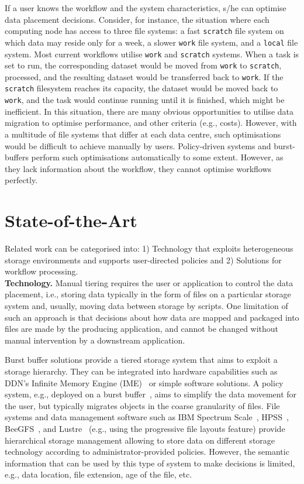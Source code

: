 \documentclass{superfri}
\begin{document}
If a user knows the workflow and the system characteristics, s/he can optimise data placement decisions.
Consider, for instance, the situation where each computing node has access to three file systems: a fast \texttt{scratch} file system on which data may reside only for a week, a slower \texttt{work} file system, and a \texttt{local} file system.
Most current workflows utilise \texttt{work} and \texttt{scratch} systems.
When a task is set to run, the corresponding dataset would be moved from \texttt{work} to \texttt{scratch}, processed, and the resulting dataset would be transferred back to \texttt{work}.
If the \texttt{scratch} filesystem reaches its capacity, the dataset would be moved back to \texttt{work}, and the task would continue running until it is finished, which might be inefficient.
In this situation, there are many obvious opportunities to utilise data migration to optimise performance, and other criteria (e.g., costs).
However, with a multitude of file systems that differ at each data centre, such optimisations would be difficult to achieve manually by users.
Policy-driven systems and burst-buffers perform such optimisations automatically to some extent. However, as they lack information about the workflow, they cannot optimise workflows perfectly.

\section{State-of-the-Art}
\label{sec:art}

Related work can be categorised into:
1) Technology that exploits heterogeneous storage environments and supports user-directed policies and
2) Solutions for workflow processing.\\

\textbf{Technology.}
Manual tiering requires the user or application to control the data placement, i.e., storing data typically in the form of files on a particular storage system and, usually, moving data between storage by scripts.
One limitation of such an approach is that decisions about how data are mapped and packaged into files are made by the producing application, and cannot be changed without manual intervention by a downstream application.

Burst buffer solutions provide a tiered storage system that aims to exploit a storage hierarchy.
They can be integrated into hardware capabilities such as DDN's Infinite Memory Engine (IME)~\cite{BODIAIFSFI19} or simple software solutions.
A policy system, e.g., deployed on a burst buffer~\cite{RomanusRP15}, aims to simplify the data movement for the user, but typically migrates objects in the coarse granularity of files.
File systems and data management software such as IBM Spectrum Scale~\cite{SchmuckH02}, HPSS~\cite{528214}, BeeGFS~\cite{beegfs}, and Lustre~\cite{abs-1903-01955} (e.g., using the progressive file layouts feature) provide hierarchical storage management allowing to store data on different storage technology according to administrator-provided policies.
However, the semantic information that can be used by this type of system to make decisions is limited, e.g., data location, file extension, age of the file, etc.
\end{document}
